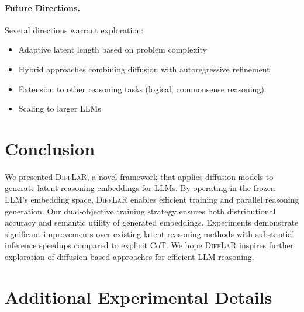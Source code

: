 \documentclass{article}
\newcommand{\difflar}{\textsc{DiffLaR}}
\begin{document}
\paragraph{Future Directions.}
Several directions warrant exploration:
\begin{itemize}
    \item Adaptive latent length based on problem complexity
    \item Hybrid approaches combining diffusion with autoregressive refinement
    \item Extension to other reasoning tasks (logical, commonsense reasoning)
    \item Scaling to larger LLMs
\end{itemize}

\section{Conclusion}
\label{sec:conclusion}

We presented \difflar{}, a novel framework that applies diffusion models to generate latent reasoning embeddings for LLMs. By operating in the frozen LLM's embedding space, \difflar{} enables efficient training and parallel reasoning generation. Our dual-objective training strategy ensures both distributional accuracy and semantic utility of generated embeddings. Experiments demonstrate significant improvements over existing latent reasoning methods with substantial inference speedups compared to explicit CoT. We hope \difflar{} inspires further exploration of diffusion-based approaches for efficient LLM reasoning.




\appendix

\section{Additional Experimental Details}
\label{app:details}
\end{document}
